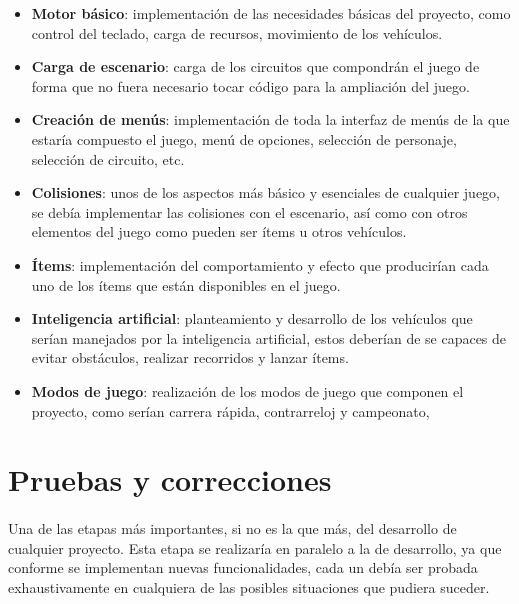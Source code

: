 \begin{itemize}
    \item \textbf{Motor básico}: implementación de las necesidades básicas del proyecto, como control del teclado, carga de recursos, movimiento
    de los vehículos.
    
    
    \item \textbf{Carga de escenario}: carga de los circuitos que compondrán el juego de forma que no fuera necesario tocar código
    para la ampliación del juego.
    
    \item \textbf{Creación de menús}: implementación de toda la interfaz de menús de la que estaría compuesto el juego, menú de 
    opciones, selección de personaje, selección de circuito, etc.
    
    \item \textbf{Colisiones}: unos de los aspectos más básico y esenciales de cualquier juego, se debía implementar las colisiones con el
    escenario, así como con otros elementos del juego como pueden ser ítems u otros vehículos.
    
    \item \textbf{Ítems}: implementación del comportamiento y efecto que
    producirían cada uno de los ítems que están disponibles en el juego.
    
    \item \textbf{Inteligencia artificial}: planteamiento y desarrollo de los vehículos que serían manejados por la inteligencia 
    artificial, estos deberían de se capaces de evitar obstáculos, realizar
    recorridos y lanzar ítems.
    
    \item \textbf{Modos de juego}: realización de los modos de juego que componen el proyecto, como serían carrera rápida, contrarreloj
    y campeonato,
\end{itemize}

\section{Pruebas y correcciones}

\paragraph{}
Una de las etapas más importantes, si no es la que más, del desarrollo de cualquier proyecto. Esta etapa se realizaría en paralelo
a la de desarrollo, ya que conforme se implementan nuevas funcionalidades, cada
un debía ser probada exhaustivamente en cualquiera
de las posibles situaciones que pudiera suceder.

